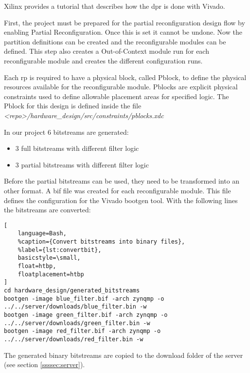 Xilinx provides a tutorial \cite{UG947} that describes how the \gls{dpr} is done with Vivado. 

First, the project must be prepared for the partial reconfiguration design flow by enabling Partial Reconfiguration. Once this is set it cannot be undone. Now the partition definitions can be created and the reconfigurable modules can be defined. This step also creates a Out-of-Context module run for each reconfigurable module and creates the different configuration runs.

Each \gls{rp} is required to have a physical block, called Pblock, to define the physical resources available for the reconfigurable module. Pblocks are explicit physical constraints used to define allowable placement areas for specified logic. The Pblock for this design is defined inside the file\\\emph{<repo>/hardware\_design/src/constraints/pblocks.xdc}

In our project $6$ bitstreams are generated:
\begin{itemize}
	\item $3$ full bitstreams with different filter logic
	\item $3$ partial bitstreams with different filter logic
\end{itemize}

Before the partial bitstreams can be used, they need to be transformed into an other format. A \gls{bif} file was created for each reconfigurable module. This file defines the configuration for the Vivado bootgen tool. With the following lines the bitstreams are converted:

\begin{lstlisting}[
    language=Bash,
    %caption={Convert bitstreams into binary files},
    %label={lst:convertbit},
    basicstyle=\small,
    float=htbp,
    floatplacement=htbp
]
cd hardware_design/generated_bitstreams
bootgen -image blue_filter.bif -arch zynqmp -o ../../server/downloads/blue_filter.bin -w
bootgen -image green_filter.bif -arch zynqmp -o ../../server/downloads/green_filter.bin -w
bootgen -image red_filter.bif -arch zynqmp -o ../../server/downloads/red_filter.bin -w
\end{lstlisting}

The generated binary bitstreams are copied to the download folder of the server (see section \ref{ssssec:server}).